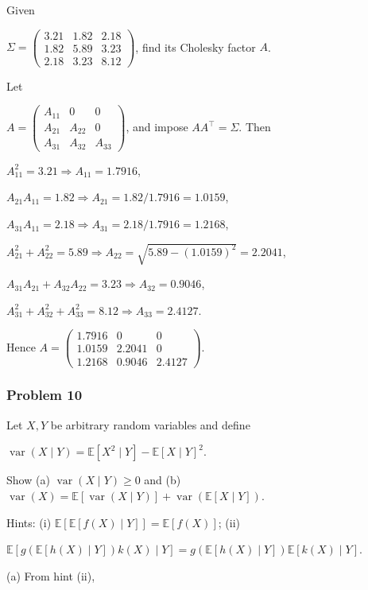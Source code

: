  Given

$\Sigma=\begin{pmatrix}3.21&1.82&2.18\\1.82&5.89&3.23\\2.18&3.23&8.12\end{pmatrix}$,
find its Cholesky factor $A$.

 Let

$A=\begin{pmatrix}A_{11}&0&0\\A_{21}&A_{22}&0\\A_{31}&A_{32}&A_{33}\end{pmatrix}$,
and impose $AA^\top=\Sigma$. Then

$A_{11}^2=3.21\Rightarrow A_{11}=1.7916$,

$A_{21}A_{11}=1.82\Rightarrow A_{21}=1.82/1.7916=1.0159$,

$A_{31}A_{11}=2.18\Rightarrow A_{31}=2.18/1.7916=1.2168$,

$A_{21}^2+A_{22}^2=5.89\Rightarrow A_{22}=\sqrt{5.89-(1.0159)^2}=2.2041$,

$A_{31}A_{21}+A_{32}A_{22}=3.23\Rightarrow A_{32}=0.9046$,

$A_{31}^2+A_{32}^2+A_{33}^2=8.12\Rightarrow A_{33}=2.4127$.

Hence
$A=\begin{pmatrix}1.7916&0&0\\1.0159&2.2041&0\\1.2168&0.9046&2.4127\end{pmatrix}$.

\subsubsection*{Problem 10}

 Let $X,Y$ be arbitrary random variables and define

$\operatorname{var}(X\mid Y)=\mathbb{E}[X^2\mid Y]-\mathbb{E}[X\mid Y]^2$.

Show (a) $\operatorname{var}(X\mid Y)\geq0$ and (b)
$\operatorname{var}(X)=\mathbb{E}[\operatorname{var}(X\mid Y)]+\operatorname{var}(\mathbb{E}[X\mid Y])$.

Hints: (i) $\mathbb{E}[\mathbb{E}[f(X)\mid Y]]=\mathbb{E}[f(X)]$; (ii)

$\mathbb{E}[g(\mathbb{E}[h(X)\mid Y])k(X)\mid Y]=g(\mathbb{E}[h(X)\mid Y])\mathbb{E}[k(X)\mid Y]$.

 (a) From hint (ii),

